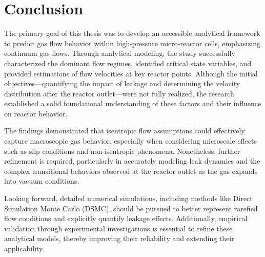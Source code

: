 \section*{Conclusion}
The primary goal of this thesis was to develop an accessible analytical framework to predict gas flow behavior within high-pressure micro-reactor cells, emphasizing continuum gas flows.
Through analytical modeling, the study successfully characterized the dominant flow regimes, identified critical state variables, and provided estimations of flow velocities at key reactor points.
Although the initial objectives—quantifying the impact of leakage and determining the velocity distribution after the reactor outlet—were not fully realized, the research established a solid foundational understanding of these factors and their influence on reactor behavior.

The findings demonstrated that isentropic flow assumptions could effectively capture macroscopic gas behavior, especially when considering microscale effects such as slip conditions and non-isentropic phenomena.
Nonetheless, further refinement is required, particularly in accurately modeling leak dynamics and the complex transitional behaviors observed at the reactor outlet as the gas expands into vacuum conditions.

Looking forward, detailed numerical simulations, including methods like Direct Simulation Monte Carlo (DSMC), should be pursued to better represent rarefied flow conditions and explicitly quantify leakage effects.
Additionally, empirical validation through experimental investigations is essential to refine these analytical models, thereby improving their reliability and extending their applicability.
